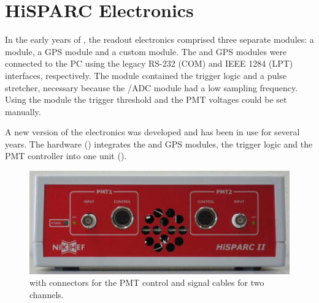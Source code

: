 \chapter{HiSPARC Electronics}
\label{ch:electronics}


In the early years of \hisparc, the readout electronics comprised three separate
modules: a \daq module, a GPS module and a custom \hisparc module. The \daq and
GPS modules were connected to the PC using the legacy RS-232 (COM) and IEEE
1284 (LPT) interfaces, respectively. The \hisparc module contained the trigger
logic and a pulse stretcher, necessary because the \daq/ADC module had a low
sampling frequency. Using the \hisparc module the trigger
threshold and the PMT voltages could be set manually.

A new version of the electronics was developed and has been in use for several
years. The \hisparcii hardware () integrates the
\daq and GPS modules, the trigger logic and the PMT controller into one unit
().
\begin{figure}
\centering
\includegraphics[width=.7\linewidth]{figures/kastje-voorkant}
\caption{ with connectors for the
PMT control and signal cables for two channels.}
\label{fig:electronics-box}
\end{figure}

